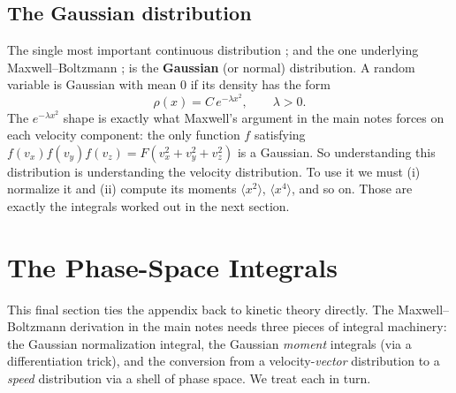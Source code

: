 \documentclass{report}
\numberwithin{equation}{section}
\begin{document}
\subsection{The Gaussian distribution}
The single most important continuous distribution ; and the one underlying Maxwell--Boltzmann ; is the \textbf{Gaussian} (or normal) distribution. A random variable is Gaussian with mean $0$ if its density has the form
\begin{equation}
	\rho(x) = C\,e^{-\lambda x^2},\qquad \lambda > 0.
\end{equation}
The $e^{-\lambda x^2}$ shape is exactly what Maxwell's argument in the main notes forces on each velocity component: the only function $f$ satisfying $f(v_x)f(v_y)f(v_z) = F(v_x^2+v_y^2+v_z^2)$ is a Gaussian. So understanding this distribution is understanding the velocity distribution. To use it we must (i) normalize it and (ii) compute its moments $\langle x^2\rangle$, $\langle x^4\rangle$, and so on. Those are exactly the integrals worked out in the next section.

\section{The Phase-Space Integrals}
This final section ties the appendix back to kinetic theory directly. The Maxwell--Boltzmann derivation in the main notes needs three pieces of integral machinery: the Gaussian normalization integral, the Gaussian \emph{moment} integrals (via a differentiation trick), and the conversion from a velocity-\emph{vector} distribution to a \emph{speed} distribution via a shell of phase space. We treat each in turn.
\end{document}

